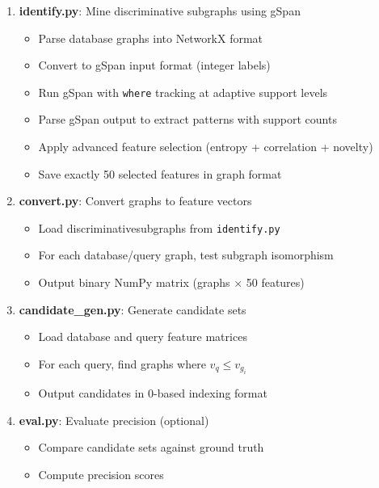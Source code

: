 \documentclass[12pt,a4paper]{article}
\begin{document}
\begin{enumerate}
    \item \textbf{identify.py}: Mine discriminative subgraphs using gSpan
    \begin{itemize}
        \item Parse database graphs into NetworkX format
        \item Convert to gSpan input format (integer labels)
        \item Run gSpan with \texttt{where} tracking at adaptive support levels
        \item Parse gSpan output to extract patterns with support counts
        \item Apply advanced feature selection (entropy + correlation + novelty)
        \item Save exactly 50 selected features in graph format
    \end{itemize}
    
    \item \textbf{convert.py}: Convert graphs to feature vectors
    \begin{itemize}
        \item Load discriminativesubgraphs from \texttt{identify.py}
        \item For each database/query graph, test subgraph isomorphism
        \item Output binary NumPy matrix (graphs $\times$ 50 features)
    \end{itemize}
    
    \item \textbf{candidate\_gen.py}: Generate candidate sets
    \begin{itemize}
        \item Load database and query feature matrices
        \item For each query, find graphs where $v_q \leq v_{g_i}$
        \item Output candidates in 0-based indexing format
    \end{itemize}
    
    \item \textbf{eval.py}: Evaluate precision (optional)
    \begin{itemize}
        \item Compare candidate sets against ground truth
        \item Compute precision scores
    \end{itemize}
\end{enumerate}
\end{document}
